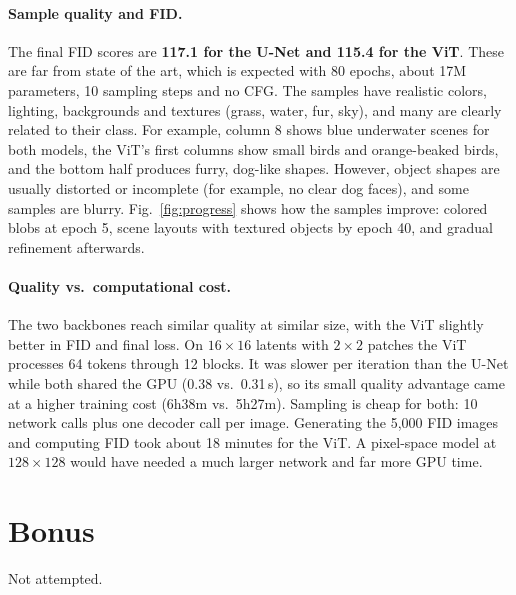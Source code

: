 \documentclass[11pt]{article}
\begin{document}
\paragraph{Sample quality and FID.} The final FID scores are \textbf{117.1 for the U-Net and 115.4 for
the ViT}. These are far from state of the art, which is expected with 80 epochs, about 17M parameters,
10 sampling steps and no CFG. The samples have realistic colors, lighting, backgrounds and textures
(grass, water, fur, sky), and many are clearly related to their class. For example, column 8 shows blue
underwater scenes for both models, the ViT's first columns show small birds and orange-beaked birds, and
the bottom half produces furry, dog-like shapes. However, object shapes are usually distorted or
incomplete (for example, no clear dog faces), and some samples are blurry. Fig.~\ref{fig:progress} shows
how the samples improve: colored blobs at epoch 5, scene layouts with textured objects by epoch 40, and
gradual refinement afterwards.

\paragraph{Quality vs.\ computational cost.} The two backbones reach similar quality at similar size,
with the ViT slightly better in FID and final loss. On $16\times16$ latents with $2\times2$ patches the ViT
processes 64 tokens through 12 blocks. It was slower per iteration than the U-Net while both shared the
GPU (0.38 vs.\ 0.31\,s), so its small quality advantage came at a higher training cost (6h38m vs.\ 5h27m).
Sampling is cheap for both: 10 network calls plus one decoder call per image. Generating the 5{,}000 FID
images and computing FID took about 18 minutes for the ViT. A pixel-space model at $128\times128$ would
have needed a much larger network and far more GPU time.

\section{Bonus}
Not attempted.
\end{document}
